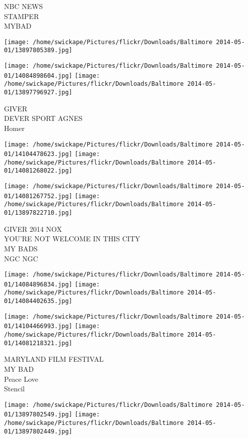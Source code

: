 \documentclass[10pt,letterpaper]{article}
\begin{document}
NBC NEWS\\
STAMPER\\
MYBAD\\
\pagebreak

\texttt{[image: /home/swickape/Pictures/flickr/Downloads/Baltimore 2014-05-01/13897805389.jpg]}

\vspace{0.25in}
\texttt{[image: /home/swickape/Pictures/flickr/Downloads/Baltimore 2014-05-01/14084898604.jpg]}
\texttt{[image: /home/swickape/Pictures/flickr/Downloads/Baltimore 2014-05-01/13897796927.jpg]}

GIVER\\
DEVER SPORT AGNES\\
Homer\\
\pagebreak

\texttt{[image: /home/swickape/Pictures/flickr/Downloads/Baltimore 2014-05-01/14104478623.jpg]}
\texttt{[image: /home/swickape/Pictures/flickr/Downloads/Baltimore 2014-05-01/14081268022.jpg]}

\texttt{[image: /home/swickape/Pictures/flickr/Downloads/Baltimore 2014-05-01/14081267752.jpg]}
\texttt{[image: /home/swickape/Pictures/flickr/Downloads/Baltimore 2014-05-01/13897822710.jpg]}

GIVER 2014 NOX\\
YOU'RE NOT WELCOME IN THIS CITY\\
MY BADS\\
NGC NGC\\
\pagebreak

\texttt{[image: /home/swickape/Pictures/flickr/Downloads/Baltimore 2014-05-01/14084896834.jpg]}
\texttt{[image: /home/swickape/Pictures/flickr/Downloads/Baltimore 2014-05-01/14084402635.jpg]}

\texttt{[image: /home/swickape/Pictures/flickr/Downloads/Baltimore 2014-05-01/14104466993.jpg]}
\texttt{[image: /home/swickape/Pictures/flickr/Downloads/Baltimore 2014-05-01/14081218321.jpg]}

MARYLAND FILM FESTIVAL\\
MY BAD\\
Peace Love\\
Stencil\\
\pagebreak

\texttt{[image: /home/swickape/Pictures/flickr/Downloads/Baltimore 2014-05-01/13897802549.jpg]}
\texttt{[image: /home/swickape/Pictures/flickr/Downloads/Baltimore 2014-05-01/13897802449.jpg]}
\end{document}
